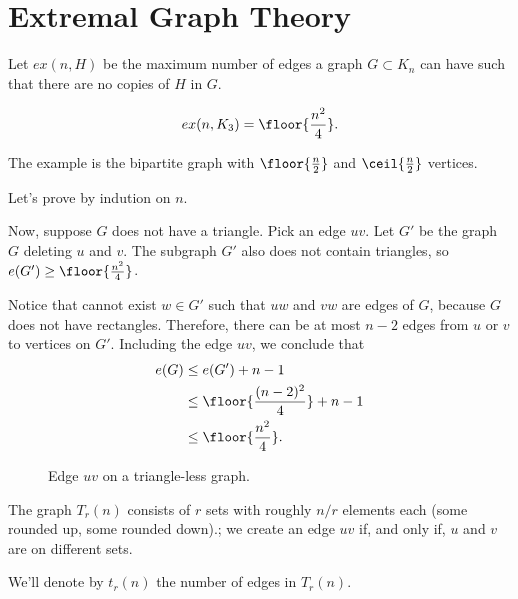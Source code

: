 \newpage
\section{Extremal Graph Theory}

\begin{defn}
	Let $ex(n, H)$ be the maximum number of edges a graph  $G \subset K_n$ can have such that there are no copies of $H$ in $G$.
\end{defn}

\begin{thm}[Mantel, 1907]
	\[
		ex(n, K_3) = \floor{\frac{n^2}{4}}.
	\]
\end{thm}

\begin{dem}
	The example is the bipartite graph with $\floor{\frac{n}{2}}$ and $\ceil{\frac{n}{2}}$ vertices.

	Let's prove by indution on $n$.

	Now, suppose $G$ does not have a triangle.
	Pick an edge $uv$. Let $G'$ be the graph $G$ deleting $u$ and $v$. The subgraph $G'$ also does not contain triangles, so $e(G') \ge \floor{\frac{n^2}{4}}$.

	Notice that cannot exist $w \in G'$ such that $uw$ and $vw$ are edges of $G$, because $G$ does not have rectangles. Therefore, there can be at most $n-2$ edges from $u$ or $v$ to vertices on $G'$. Including the edge $uv$, we conclude that
	\begin{align*}
		e(G) &\le e(G') + n - 1\\
			 &\le \floor{\frac{(n-2)^2}{4}} + n - 1\\
			 &\le \floor{\frac{n^2}{4}}.
	\end{align*}
\end{dem}

\begin{figure}[ht]
    \centering
    \caption{Edge $uv$ on a triangle-less graph.}
    \label{fig:edge-uv-on-a-triangle-less-graph}
\end{figure}

\begin{defn}
	The graph $T_r(n)$ consists of $r$ sets with roughly $n/r$ elements each (some rounded up, some rounded down).; we create an edge $uv$ if, and only if, $u$ and $v$ are on different sets.

	We'll denote by $t_r(n)$ the number of edges in $T_r(n)$.
\end{defn}

